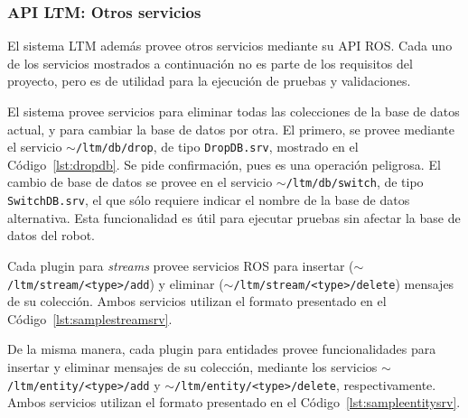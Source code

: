 \subsubsection{API LTM: Otros servicios}

El sistema LTM además provee otros servicios mediante su API ROS. Cada uno de los servicios mostrados a continuación no es parte de los requisitos del proyecto, pero es de utilidad para la ejecución de pruebas y validaciones.

El sistema provee servicios para eliminar todas las colecciones de la base de datos actual, y para cambiar la base de datos por otra. El primero, se provee mediante el servicio \texttt{$\sim$/ltm/db/drop}, de tipo \texttt{DropDB.srv}, mostrado en el Código~\ref{lst:dropdb}. Se pide confirmación, pues es una operación peligrosa. El cambio de base de datos se provee en el servicio  \texttt{$\sim$/ltm/db/switch}, de tipo \texttt{SwitchDB.srv}, el que sólo requiere indicar el nombre de la base de datos alternativa. Esta funcionalidad es útil para ejecutar pruebas sin afectar la base de datos del robot.
\lstset{style=/Style/ROS/MSG}


Cada plugin para \textit{streams} provee servicios ROS para insertar (\texttt{$\sim$/ltm/stream/\textless type\textgreater/add}) y eliminar (\texttt{$\sim$/ltm/stream/\textless type\textgreater/delete}) mensajes de su colección. Ambos servicios utilizan el formato presentado en el Código~\ref{lst:samplestreamsrv}.

De la misma manera, cada plugin para entidades provee funcionalidades para insertar y eliminar mensajes de su colección, mediante los servicios \texttt{$\sim$/ltm/entity/\textless type\textgreater/add} y \texttt{$\sim$/ltm/entity/\textless type\textgreater/delete}, respectivamente. Ambos servicios utilizan el formato presentado en el Código~\ref{lst:sampleentitysrv}.




